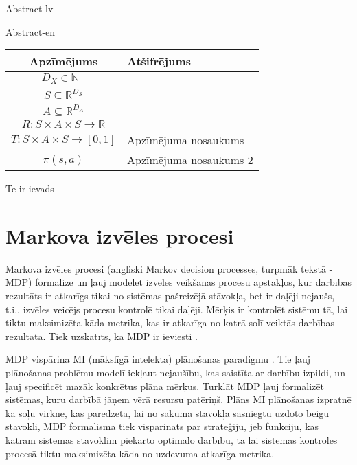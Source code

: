 \documentclass{ludis} %
\begin{document}
\maketitle

\begin{abstract-lv}
Abstract-lv
\end{abstract-lv}
\clearpage

\begin{abstract-en}
Abstract-en
\end{abstract-en}


\tableofcontents

\setlength\LTleft{0pt}
\setlength\LTright{0pt}
\begin{longtable}{| c | p{28em} |}
  \hline
  \textbf{Apzīmējums} & \textbf{Atšifrējums}\\ 
  \endhead

  \hline
  $D_X \in \mathbb{N}_+$ & \\
  $S \subseteq \mathbb{R}^{D_S}$ & \\
  $A \subseteq \mathbb{R}^{D_A}$ & \\
  $R:S \times A \times S \rightarrow \mathbb{R}$ & \\
  $T:S \times A \times S \rightarrow [0,1]$ & Apzīmējuma nosaukums \\
  $\pi(s, a)$ &  Apzīmējuma nosaukums 2\\
  \hline
\end{longtable}

Te ir ievads
\chapter{Markova izvēles procesi}
Markova izvēles procesi (angliski Markov decision processes, turpmāk tekstā - MDP) formalizē un ļauj modelēt izvēles veikšanas procesu apstākļos, kur darbības rezultāts ir atkarīgs tikai no sistēmas pašreizējā stāvokļa, bet ir daļēji nejaušs, t.i., izvēles veicējs procesu kontrolē tikai daļēji.
Mērķis ir kontrolēt sistēmu tā, lai tiktu maksimizēta kāda metrika, kas ir atkarīga no katrā solī veiktās darbības rezultāta.
Tiek uzskatīts, ka MDP ir ieviesti \autocite{Bel}.

MDP vispārina MI (mākslīgā intelekta) plānošanas paradigmu \autocite{Hendler1990ai}.
Tie ļauj plānošanas problēmu modelī iekļaut nejaušību, kas saistīta ar darbību izpildi, un ļauj specificēt mazāk konkrētus plāna mērķus.
Turklāt MDP ļauj formalizēt sistēmas, kuru darbībā jāņem vērā resursu patēriņš.
Plāns MI plānošanas izpratnē kā soļu virkne, kas paredzēta, lai no sākuma stāvokļa sasniegtu uzdoto beigu stāvokli, MDP formālismā tiek vispārināts par stratēģiju, jeb funkciju, kas katram sistēmas stāvoklim piekārto optimālo darbību, tā lai sistēmas kontroles procesā tiktu maksimizēta kāda no uzdevuma atkarīga metrika.
\end{document}
